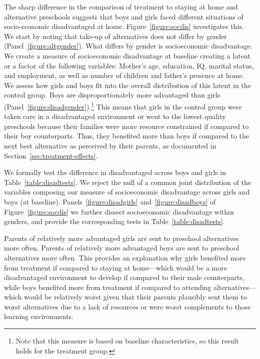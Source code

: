 The sharp difference in the comparison of treatment to staying at home and alternative preschools suggests that boys and girls faced different situations of socio-economic disadvantaged at home. Figure~\ref{figure:socdis} investigates this. We start by noting that take-up of alternatives does not differ by gender (Panel~\ref{figure:altgender}). What differs by gender is socioeconomic disadvantage. We create a measure of socioeconomic disadvantage at baseline creating a latent or a factor of the following variables: Mother's age, education, IQ, marital status, and employment, as well as number of children and father's presence at home. We assess how girls and boys fit into the overall distribution of this latent in the control group. Boys are disproportionately more advantaged than girls (Panel~\ref{figure:disadgender}).\footnote{Note that this measure is based on baseline characteristics, so this result holds for the treatment group.} This means that girls in the control group were taken care in a disadvantaged environment or went to the lowest quality preschools because their families were more resource constrained if compared to their boy counterparts. Thus, they benefited more than boys if compared to the next best  alternative as perceived by their parents, as documented in Section~\ref{sec:treatment-effects}.

We formally test the difference in disadvantaged across boys and girls in Table~\ref{table:disadtests}. We reject the null of a common joint distribution of the variables composing our measure of socioeconomic disadvantage across girls and boys (at baseline). Panels~\ref{figure:disadgirls} and~\ref{figure:disadboys} of Figure~\ref{figure:socdis} we further dissect socioeconomic disadvantage within genders, and provide the corresponding tests in Table~\ref{table:disadtests}. 

Parents of relatively more advantaged girls are sent to preschool alternatives more often. Parents of relatively more advantaged boys are sent to preschool alternatives more often. This provides an explanation why girls benefited more from treatment if compared to staying at home---which would be a more disadvantaged environment to develop if compared to their male counterparts, while boys benefited more from treatment if compared to attending alternatives---which would be relatively worst given that their parents plausibly sent them to worst alternatives due to a lack of resources or were worst complements to those learning environments. 

